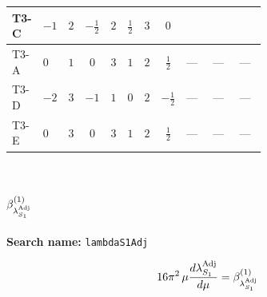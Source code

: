 \documentclass[8pt]{article}
\begin{document}
\begin{landscape}
\begin{longtable}{@{}llcccccc >{\raggedright\arraybackslash}p{0.21\linewidth} >{\raggedright\arraybackslash}p{0.21\linewidth} >{\raggedright\arraybackslash}p{0.21\linewidth}@{}}
\midrule
T3-C & $-1$ & $2$ & $-\frac{1}{2}$ & $2$ & $\frac{1}{2}$ & $3$ & $0$ & \scriptsize\adjustbox{max width=\linewidth}{$\begin{gathered} +8 {\lambda_{H2}} {\lambda_{H^\dagger H^\dagger S_2 S_2}}\end{gathered}$} & \scriptsize\adjustbox{max width=\linewidth}{$\begin{gathered} +4 {\lambda_{H2}^{\rm Adj}} {\lambda_{H^\dagger H^\dagger S_2 S_2}}\end{gathered}$} & \scriptsize\adjustbox{max width=\linewidth}{$\begin{gathered} +2 {\lambda_{H^\dagger H^\dagger S_2 S_2}} {\lambda_{S_2}}\end{gathered}$} \\
\midrule
T3-A & $0$ & $1$ & $0$ & $3$ & $1$ & $2$ & $\frac{1}{2}$ & --- & --- & --- \\
\midrule
T3-D & $-2$ & $3$ & $-1$ & $1$ & $0$ & $2$ & $-\frac{1}{2}$ & --- & --- & --- \\
\midrule
T3-E & $0$ & $3$ & $0$ & $3$ & $1$ & $2$ & $\frac{1}{2}$ & --- & --- & --- \\
\midrule
\bottomrule
\end{longtable}
\clearpage
\section*{$\beta_{\lambda_{S_1}^{\rm Adj}}^{(1)}$}
\noindent\textbf{Search name: }\texttt{lambdaS1Adj}\par\smallskip
\[16\pi^2\,\mu\frac{d \lambda_{S_1}^{\rm Adj}}{d\mu}=\beta_{\lambda_{S_1}^{\rm Adj}}^{(1)}\]

\end{landscape}
\end{document}
